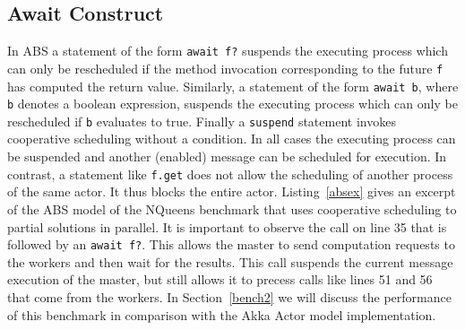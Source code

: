 





\subsection{Await Construct}
In ABS a statement of the form \texttt{await f?}
suspends the executing process which can only be rescheduled if the method
invocation corresponding to the future \texttt{f} has computed the return value.
Similarly, a statement of the form \texttt{await b}, where \texttt{b} denotes a boolean expression, suspends the executing process which can only be rescheduled if \texttt{b} evaluates to true. Finally a \texttt{suspend} statement invokes cooperative scheduling without a condition. In all cases the executing process can be suspended and another (enabled) message can be scheduled for execution.
In contrast, a statement like \texttt{f.get} does not allow the scheduling of
another process of the same actor. It thus blocks the entire actor. Listing~\ref{absex} gives an excerpt of the ABS model of the NQueens benchmark that uses cooperative scheduling to partial solutions in parallel. It is important to observe the call on line 35 that is followed by an \texttt{await f?}. This allows the master to send computation requests to the workers and then wait for the results. This call suspends the current message execution of the master, but still allows it to precess calls like lines 51 and 56 that come from the workers. In Section~\ref{bench2} we will discuss the performance of this benchmark in comparison with the Akka Actor model implementation.


%
%


